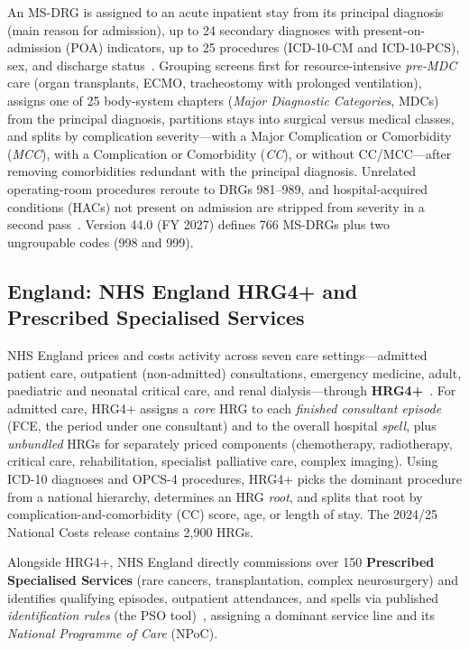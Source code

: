 \documentclass[fleqn,10pt]{IOMEDArticle}
\begin{document}
An MS-DRG is assigned to an acute inpatient stay from its principal diagnosis (main reason for admission), up to 24 secondary diagnoses with present-on-admission (POA) indicators, up to 25 procedures (ICD-10-CM and ICD-10-PCS), sex, and discharge status~\cite{cms2026msdrg,cms2026msdrgmanual}. Grouping screens first for resource-intensive \emph{pre-MDC} care (organ transplants, ECMO, tracheostomy with prolonged ventilation), assigns one of 25 body-system chapters (\emph{Major Diagnostic Categories}, MDCs) from the principal diagnosis, partitions stays into surgical versus medical classes, and splits by complication severity---with a Major Complication or Comorbidity (\emph{MCC}), with a Complication or Comorbidity (\emph{CC}), or without CC/MCC---after removing comorbidities redundant with the principal diagnosis. Unrelated operating-room procedures reroute to DRGs 981--989, and hospital-acquired conditions (HACs) not present on admission are stripped from severity in a second pass~\cite{cms2005hac}. Version 44.0 (FY 2027) defines 766 MS-DRGs plus two ungroupable codes (998 and 999).

\subsection{England: NHS England HRG4+ and Prescribed Specialised Services}

NHS England prices and costs activity across seven care settings---admitted patient care, outpatient (non-admitted) consultations, emergency medicine, adult, paediatric and neonatal critical care, and renal dialysis---through \textbf{HRG4+}~\cite{nhse2025hrg,nhsd2020casemix}. For admitted care, HRG4+ assigns a \emph{core} HRG to each \emph{finished consultant episode} (FCE, the period under one consultant) and to the overall hospital \emph{spell}, plus \emph{unbundled} HRGs for separately priced components (chemotherapy, radiotherapy, critical care, rehabilitation, specialist palliative care, complex imaging). Using ICD-10 diagnoses and OPCS-4 procedures, HRG4+ picks the dominant procedure from a national hierarchy, determines an HRG \emph{root}, and splits that root by complication-and-comorbidity (CC) score, age, or length of stay. The 2024/25 National Costs release contains 2{,}900 HRGs.

Alongside HRG4+, NHS England directly commissions over 150 \textbf{Prescribed Specialised Services} (rare cancers, transplantation, complex neurosurgery) and identifies qualifying episodes, outpatient attendances, and spells via published \emph{identification rules} (the PSO tool)~\cite{nhse2026pso}, assigning a dominant service line and its \emph{National Programme of Care} (NPoC).
\end{document}

